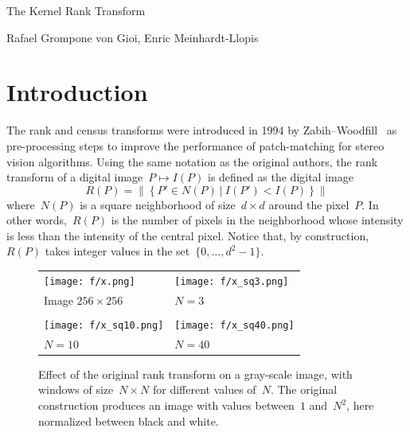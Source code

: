 \documentclass[12pt]{article}                  %
\begin{document}
\begin{center}
	\Huge The Kernel Rank Transform

	\large Rafael Grompone von Gioi, Enric Meinhardt-Llopis
\end{center}

\bigskip

\section{Introduction}

The rank and census transforms were introduced in 1994 by
Zabih--Woodfill~\cite{ZW} as pre-processing steps to improve the performance
of patch-matching for stereo vision algorithms.
Using the same notation as the original authors, the rank transform of a
digital image~$P\mapsto I(P)$ is defined as the
digital image
\begin{equation}\label{eq:rt}
	R(P) = \left\|\left\{
		P'\in N(P)\ |\ I(P')< I(P)
	\right\}\right\|
\end{equation}
where~$N(P)$ is a square neighborhood of size~$d\times d$ around the pixel~$P$.
In other words,~$R(P)$ is the number of pixels in the neighborhood
whose intensity is less than the intensity of the central pixel.
Notice that, by construction,~$R(P)$ takes integer values in the
set~$\{0,\ldots,d^2-1\}$.

\begin{figure}[p]
	\begin{tabular}{ll}
		\texttt{[image: f/x.png]} &
		\texttt{[image: f/x\_sq3.png]} \\
		Image $256\times256$&
		$N=3$ \\
		&\\
		\texttt{[image: f/x\_sq10.png]} &
		\texttt{[image: f/x\_sq40.png]} \\
		$N=10$ &
		$N=40$ \\
	\end{tabular}
	\caption{\label{fig:original rank transform}
	Effect of the original rank transform on a gray-scale image, with
	windows of size~$N\times N$ for different values of~$N$.
	The original construction produces an image with values between~$1$
	and~$N^2$, here normalized between black and white.
	}
\end{figure}
\end{document}
